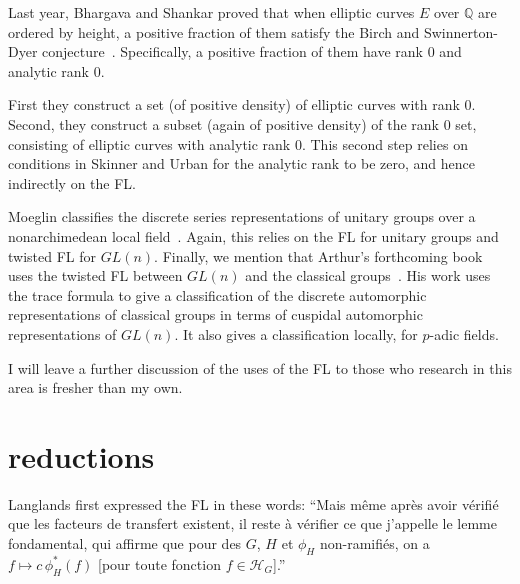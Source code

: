 \documentclass[brochure,english,12pt]{bourbaki}
\newcommand{\ring}[1]{\mathbb{#1}}
\begin{document}

Last year, Bhargava and Shankar proved that when elliptic curves $E$
over $\ring{Q}$ are ordered by height, a positive fraction of them
satisfy the Birch and Swinnerton-Dyer conjecture~\cite{BS:2010}.
Specifically, a positive fraction of them have rank $0$ and analytic
rank $0$.

First they construct a set (of positive
density) of elliptic curves with rank $0$.  Second, they construct a
subset (again of positive density) of the rank $0$ set, consisting of
elliptic curves with analytic rank $0$.  This second step relies on
conditions in Skinner and Urban for the analytic rank to be zero, and hence
indirectly on the FL.


Moeglin classifies the discrete series representations of unitary
groups over a nonarchimedean local field~\cite{Moeglin:2007}.  Again, this
relies on the FL for unitary groups and twisted FL for
$GL(n)$. Finally, we mention that Arthur's forthcoming book uses
the twisted FL between $GL(n)$ and the classical
groups~\cite{Arthur:2011}.  His work uses the trace formula to give a
classification of the discrete automorphic representations of
classical groups in terms of cuspidal automorphic representations of
$GL(n)$.  It also gives a classification locally, for $p$-adic fields.

I will leave a further discussion of the uses of the FL to those who research
in this area is fresher than my own.

%
%







\section{reductions}\label{sec:reduce}

Langlands first expressed the FL in these words:
``Mais m\^eme apr\`es avoir
v\'erifi\'e que les facteurs de
transfert existent, il reste \`a v\'erifier ce que j'appelle le
lemme fondamental, qui affirme que pour des $G$, $H$ et $\phi_H$
non-ramifi\'es, on a $f\mapsto c\, \phi_H^*(f)$ [pour toute fonction $f\in {\mathcal H}_G$].''
\cite[p.49]{Langlands:debuts}
\end{document}
